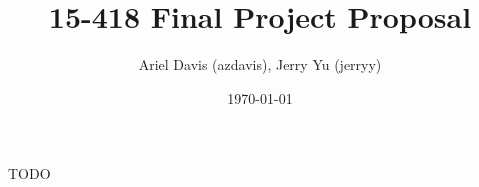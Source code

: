 \documentclass[12pt]{article}
\author{Ariel Davis (azdavis), Jerry Yu (jerryy)}
\date{\today}
\title{15-418 Final Project Proposal}
\begin{document}
\maketitle

TODO
\end{document}
